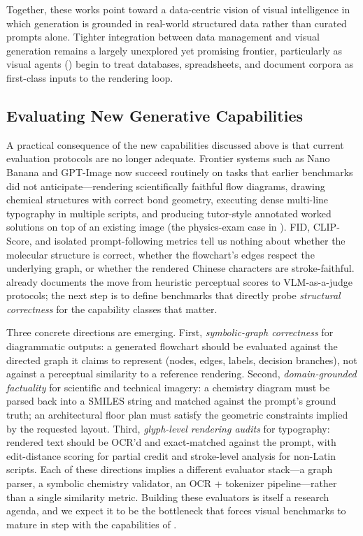 Together, these works point toward a data-centric vision of visual intelligence in which generation is grounded in real-world structured data rather than curated prompts alone. Tighter integration between data management and visual generation remains a largely unexplored yet promising frontier, particularly as visual agents () begin to treat databases, spreadsheets, and document corpora as first-class inputs to the rendering loop.

\subsection{Evaluating New Generative Capabilities}
\label{subsec:eval_frontier}

A practical consequence of the new capabilities discussed above is that current evaluation protocols are no longer adequate. Frontier systems such as Nano Banana and GPT-Image now succeed routinely on tasks that earlier benchmarks did not anticipate---rendering scientifically faithful flow diagrams, drawing chemical structures with correct bond geometry, executing dense multi-line typography in multiple scripts, and producing tutor-style annotated worked solutions on top of an existing image (the physics-exam case in ). FID, CLIP-Score, and isolated prompt-following metrics tell us nothing about whether the molecular structure is correct, whether the flowchart's edges respect the underlying graph, or whether the rendered Chinese characters are stroke-faithful.  already documents the move from heuristic perceptual scores to VLM-as-a-judge protocols; the next step is to define benchmarks that directly probe \emph{structural correctness} for the capability classes that matter.

Three concrete directions are emerging. First, \emph{symbolic-graph correctness} for diagrammatic outputs: a generated flowchart should be evaluated against the directed graph it claims to represent (nodes, edges, labels, decision branches), not against a perceptual similarity to a reference rendering. Second, \emph{domain-grounded factuality} for scientific and technical imagery: a chemistry diagram must be parsed back into a SMILES string and matched against the prompt's ground truth; an architectural floor plan must satisfy the geometric constraints implied by the requested layout. Third, \emph{glyph-level rendering audits} for typography: rendered text should be OCR'd and exact-matched against the prompt, with edit-distance scoring for partial credit and stroke-level analysis for non-Latin scripts. Each of these directions implies a different evaluator stack---a graph parser, a symbolic chemistry validator, an OCR + tokenizer pipeline---rather than a single similarity metric. Building these evaluators is itself a research agenda, and we expect it to be the bottleneck that forces visual benchmarks to mature in step with the capabilities of .

